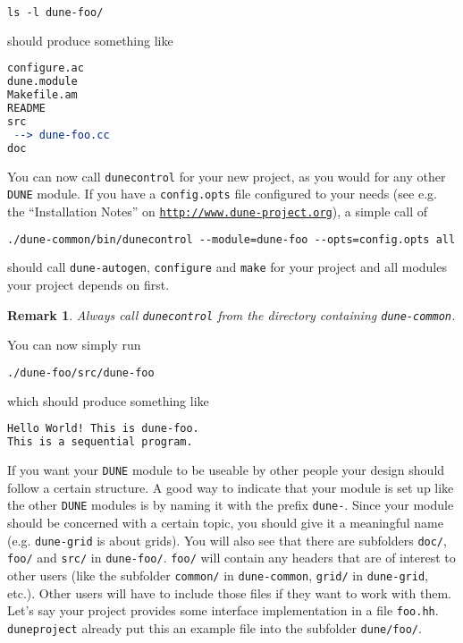 \documentclass[11pt,a4paper,headinclude,footinclude,DIV16,normalheadings]{scrartcl}
\newtheorem{remark}{Remark}[section]
\newcommand{\dune}{\texttt{DUNE}\xspace}
\newcommand{\autogen}{\texttt{dune-autogen}\xspace}
\newcommand{\configure}{\texttt{configure}\xspace}
\newcommand{\dunecommon}{\texttt{dune-common}\xspace}
\newcommand{\dunegrid}{\texttt{dune-grid}\xspace}
\newcommand{\dunecontrol}{\texttt{dunecontrol}\xspace}
\newcommand{\duneproject}{\texttt{duneproject}\xspace}
\newcommand{\make}{\texttt{make}\xspace}
\begin{document}
\begin{lstlisting}[language=make]
ls -l dune-foo/
\end{lstlisting}
should produce something like

\begin{lstlisting}[language=make]
configure.ac
dune.module
Makefile.am
README
src
 --> dune-foo.cc
doc
\end{lstlisting}

You can now call \dunecontrol for your new project, as you would for any other \dune module. If you have a \texttt{config.opts}\xspace
file configured to your needs (see e.g. the ``Installation Notes'' on
\texttt{\url{http://www.dune-project.org}}), a simple call of

\begin{lstlisting}[language=make]
./dune-common/bin/dunecontrol --module=dune-foo --opts=config.opts all
\end{lstlisting}
should call \autogen, \configure and \make for your
project and all modules your project depends on first.

\begin{remark}
Always call \dunecontrol from the directory containing \dunecommon.
\end{remark}

You can now  simply run

\begin{lstlisting}[language=make]
./dune-foo/src/dune-foo
\end{lstlisting}
which should produce something like

\begin{lstlisting}[language=make]
Hello World! This is dune-foo.
This is a sequential program.
\end{lstlisting}

If you want your \dune module to be useable by other people your
design should follow a certain structure. A good way to indicate that
your module is set up like the other \dune modules is by naming it
with the prefix \texttt{dune-}\xspace.  Since your module should be
concerned with a certain topic, you should give it a meaningful name
(e.g. \dunegrid is about grids).  You will also see that there are
subfolders \texttt{doc/}\xspace, \texttt{foo/}\xspace and
\texttt{src/}\xspace in \texttt{dune-foo/}\xspace.
\texttt{foo/}\xspace will contain any headers that are of interest to
other users (like the subfolder \texttt{common/}\xspace in
\dunecommon, \texttt{grid/}\xspace in \dunegrid, etc.). Other users
will have to include those files if they want to work with them. Let's
say your project provides some interface implementation in a file
\texttt{foo.hh}\xspace. \duneproject already put this an example file
into the subfolder \texttt{dune/foo/}.
\end{document}
